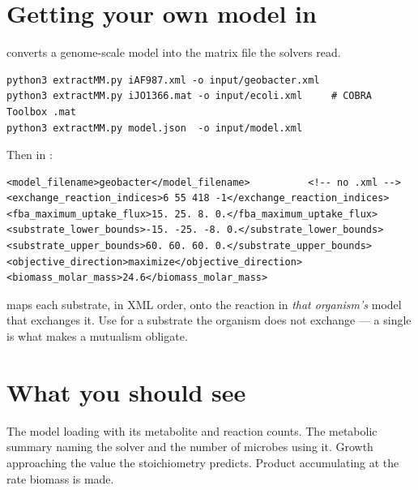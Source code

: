 
\section{Getting your own model in}

 converts a genome-scale model into the matrix file the
solvers read.

\begin{lstlisting}[style=sh]
python3 extractMM.py iAF987.xml -o input/geobacter.xml
python3 extractMM.py iJO1366.mat -o input/ecoli.xml     # COBRA Toolbox .mat
python3 extractMM.py model.json  -o input/model.xml
\end{lstlisting}

Then in :

\begin{lstlisting}[style=xml]
<model_filename>geobacter</model_filename>          <!-- no .xml -->
<exchange_reaction_indices>6 55 418 -1</exchange_reaction_indices>
<fba_maximum_uptake_flux>15. 25. 8. 0.</fba_maximum_uptake_flux>
<substrate_lower_bounds>-15. -25. -8. 0.</substrate_lower_bounds>
<substrate_upper_bounds>60. 60. 60. 0.</substrate_upper_bounds>
<objective_direction>maximize</objective_direction>
<biomass_molar_mass>24.6</biomass_molar_mass>
\end{lstlisting}

 maps each substrate, in XML order, onto the
reaction in \emph{that organism's} model that exchanges it. Use  for a
substrate the organism does not exchange --- a single  is what makes a
mutualism obligate.


\section{What you should see}

The model loading with its metabolite and reaction counts. The metabolic
summary naming the solver and the number of microbes using it. Growth
approaching the value the stoichiometry predicts. Product accumulating at the
rate biomass is made.

